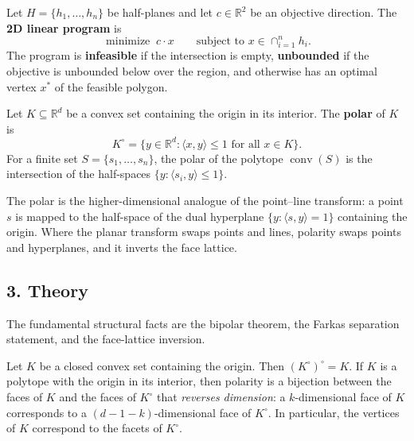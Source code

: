 \begin{definition}\label{def:geo_duality_lp}
  Let $H = \{h_1, \dots, h_n\}$ be half-planes and let $c \in
  \mathbb{R}^2$ be an objective direction. The \textbf{2D linear program}
  is
  \[
    \operatorname{minimize}\; c \cdot x \qquad \text{subject to } x \in
    \cap_{i=1}^n h_i .
  \]
  The program is \textbf{infeasible} if the intersection is empty,
  \textbf{unbounded} if the objective is unbounded below over the region, and
  otherwise has an optimal vertex $x^*$ of the feasible polygon.
\end{definition}

\begin{definition}\label{def:geo_duality_polar}
  Let $K \subseteq \mathbb{R}^d$ be a convex set containing the origin in
  its interior. The \textbf{polar} of $K$ is
  \[
    K^\circ = \{ y \in \mathbb{R}^d : \langle x, y \rangle \le 1 \text{ for
    all } x \in K \} .
  \]
  For a finite set $S = \{s_1, \dots, s_n\}$, the polar of the polytope
  $\operatorname{conv}(S)$ is the intersection of the half-spaces
  $\{ y : \langle s_i, y \rangle \le 1 \}$.
\end{definition}

The polar is the higher-dimensional analogue of the point--line transform:
a point $s$ is mapped to the half-space of the dual hyperplane
$\{y : \langle s, y \rangle = 1\}$ containing the origin. Where the planar
transform swaps points and lines, polarity swaps points and hyperplanes,
and it inverts the face lattice.

\subsection{3. Theory}

The fundamental structural facts are the bipolar theorem, the Farkas
separation statement, and the face-lattice inversion.

\begin{theorem}\label{thm:geo_duality_polar_duality}
  Let $K$ be a closed convex set containing the origin. Then
  $(K^\circ)^\circ = K$. If $K$ is a polytope with the origin in its
  interior, then polarity is a bijection between the faces of $K$ and the
  faces of $K^\circ$ that \emph{reverses dimension}: a $k$-dimensional face
  of $K$ corresponds to a $(d-1-k)$-dimensional face of $K^\circ$. In
  particular, the vertices of $K$ correspond to the facets of $K^\circ$.
\end{theorem}

